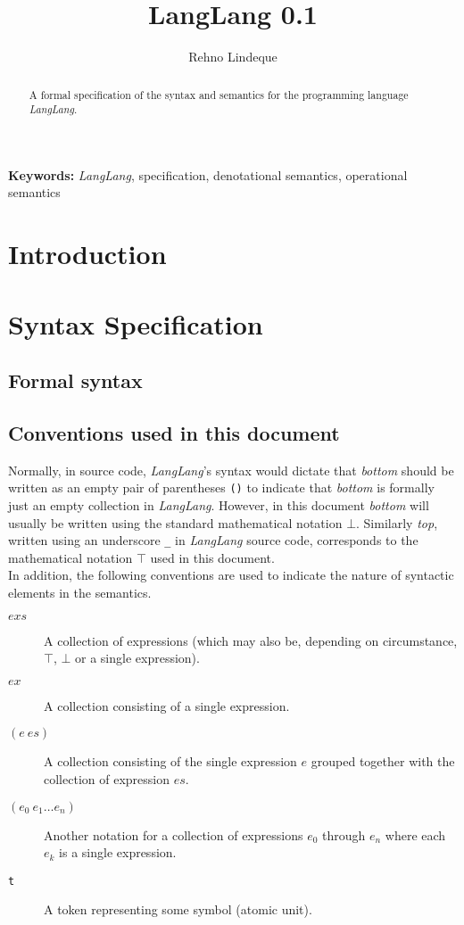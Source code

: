 \documentclass[a4paper,11pt]{article}
\begin{document}
\title{LangLang 0.1}
\author{Rehno Lindeque}

\maketitle

\begin{abstract}
A formal specification of the syntax and semantics for the programming language \textsl{LangLang}.
\end{abstract}
\textbf{Keywords:} \textsl{LangLang}, specification, denotational semantics, operational semantics

\section{Introduction}

\section{Syntax Specification}
\subsection{Formal syntax}

\subsection{Conventions used in this document}
\label{sec:conventions}

Normally, in source code, \textsl{LangLang}'s syntax would dictate that \emph{bottom} should be written as an empty pair of parentheses \texttt{()} to indicate that \emph{bottom} is formally just an empty collection in \textsl{LangLang}.
However, in this document \emph{bottom} will usually be written using the standard mathematical notation $\bot$.
Similarly \emph{top}, written using an underscore \texttt{\_} in \textsl{LangLang} source code, corresponds to the mathematical notation $\top$ used in this document.\\

In addition, the following conventions are used to indicate the nature of syntactic elements in the semantics.

\begin{description}
  \item[$exs$] A collection of expressions (which may also be, depending on circumstance, $\top$, $\bot$ or a single expression).
  \item[$ex$] A collection consisting of a single expression.
  \item[$(e\ es)$] A collection consisting of the single expression $e$ grouped together with the collection of expression $es$.
  \item[$(e_0\ e_1 \dots e_n)$] Another notation for a collection of expressions $e_0$ through $e_n$ where each $e_k$ is a single expression.
  \item[\texttt{t}] A token representing some symbol (atomic unit).
\end{description}
\end{document}
